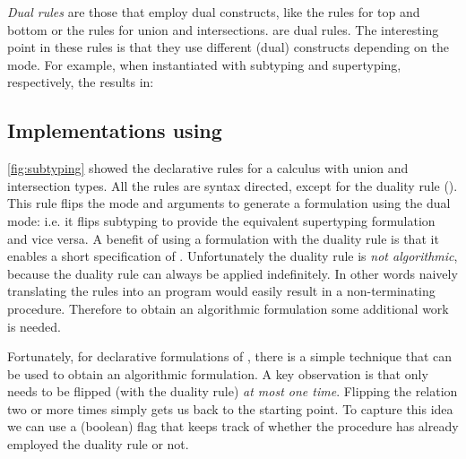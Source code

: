 \emph{Dual rules} are those that employ dual constructs, like the
rules for top and bottom or the rules for union and intersections.
 are dual
rules. The interesting point in these rules is that they use different (dual)
constructs depending on the mode. For example, when instantiated with subtyping
and supertyping, respectively, the  results in:


\subsection{Implementations using \nameduo}
\label{sec:overview:3}

\cref{fig:subtyping} showed the declarative \nameduo rules for a calculus
with union and intersection types. All the rules are syntax directed, except
for the duality rule (). This rule flips the mode and arguments to
generate a formulation using the dual mode: i.e. it flips subtyping to provide
the equivalent supertyping formulation and vice versa. 
A benefit of using a formulation with the duality rule is that it
enables a short specification of \nameduo. Unfortunately the duality rule
is \emph{not algorithmic}, because the duality rule can always be applied
indefinitely. In other words naively translating the rules into an program
would easily result in a non-terminating procedure. 
Therefore to obtain an algorithmic formulation some additional
work is needed.

Fortunately, for declarative formulations of \nameduo, there is a simple
technique that can be used to obtain an algorithmic formulation. A key
observation is that \nameduo only needs to be flipped (with the duality rule) \emph{at
  most one time}. Flipping the relation two or more times simply gets
us back to the starting point. To capture this idea we can use a (boolean)
flag that keeps track of whether the procedure has already employed the
duality rule or not.




